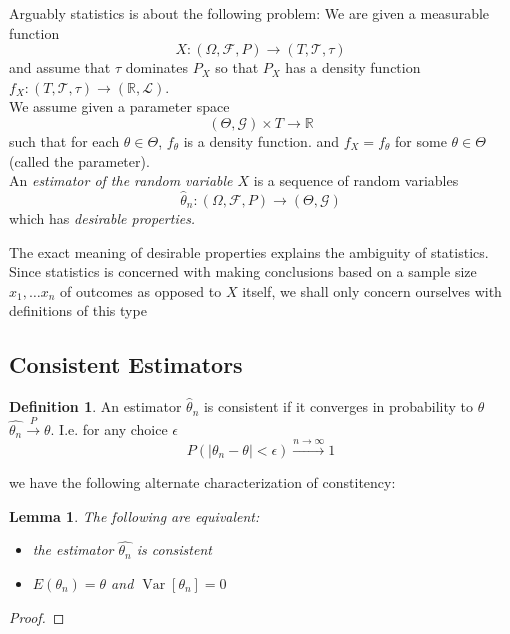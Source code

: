\documentclass{book}
\theoremstyle{plain}
\newtheorem{lemma}[corollary]{Lemma}
\theoremstyle{definition}
\newtheorem{definition}[corollary]{Definition}
\renewcommand{\d}[1]{\mathbb{#1}}
\newcommand{\mor}{\longrightarrow}
\renewcommand{\r}[1]{\mathcal{#1}}
\renewcommand{\r}[1]{\mathcal{#1}}
\DeclareMathOperator{\Var}{Var}
\begin{document}
Arguably statistics is about the following problem: We are given a measurable function
\[
X:(\Omega, \r{F}, P)\mor (T,\r{T},\tau)
\]
and assume that $\tau$ dominates $P_X$ so that $P_X$ has a density function $f_X: (T,\r{T},\tau) \mor (\d{R},\r{L})$.\\
We assume given a parameter space
\[
(\Theta, \r{G})\times T\mor \d{R}
\]
such that for each $\theta \in \Theta$, $f_\theta$ is a density function. and $f_X=f_\theta$ for some $\theta \in \Theta$ (called the parameter).\\
An \emph{estimator of the random variable $X$} is a sequence of random variables
\[
\hat{\theta}_n:(\Omega,\r{F},P)\mor (\Theta, \r{G})
\] 
which has \emph{desirable properties.}
\begin{center}
The exact meaning of desirable properties explains the ambiguity of statistics. Since statistics is concerned with making conclusions based on a sample size $x_1,\ldots x_n$ of outcomes as opposed to $X$ itself, we shall only concern ourselves with definitions of this type
\end{center}
 
 
\subsection{Consistent Estimators}

\begin{definition}
An estimator $\hat{\theta}_n$ is consistent if it converges in probability to $\theta$ $\hat{\theta_n}\stackrel{P}{\mor} \theta$. I.e. for any choice $\epsilon$
\[
P(\vert \theta_n-\theta\vert <\epsilon)\stackrel{n\to \infty}{\mor} 1
\]
\end{definition}

we have the following alternate characterization of constitency:

\begin{lemma}
The following are equivalent:
\begin{itemize}
\item the estimator $\hat{\theta_n}$ is consistent
\item $E(\theta_n)=\theta$ and $\Var[\theta_n]=0$	
\end{itemize}
\end{lemma}

\begin{proof}
	
\end{proof}
 
 
\end{document}
